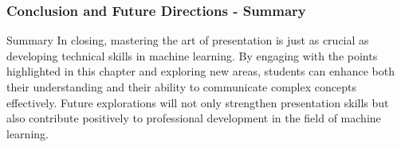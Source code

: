 \documentclass[aspectratio=169]{beamer}
\begin{document}
\begin{frame}[fragile]
    \frametitle{Conclusion and Future Directions - Summary}
    
    \begin{block}{Summary}
        In closing, mastering the art of presentation is just as crucial as developing technical skills in machine learning. By engaging with the points highlighted in this chapter and exploring new areas, students can enhance both their understanding and their ability to communicate complex concepts effectively. Future explorations will not only strengthen presentation skills but also contribute positively to professional development in the field of machine learning.
    \end{block}
    
\end{frame}
\end{document}

